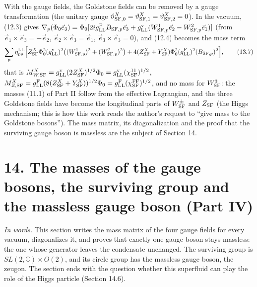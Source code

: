 \documentclass[
  10pt,
]{article}
\begin{document}
With the gauge fields, the Goldstone fields can be removed by a gauge
transformation (the unitary gauge
\(\vartheta^X_{{\rm SF},0}=\vartheta^X_{{\rm SF},1}=\vartheta^X_{{\rm SF},2}=0\)).
In the vacuum, (12.3) gives
\(\nabla_p(\Phi_0\vec e_3)=\Phi_0[2ig^{\rm F}_{\rm LL}B_{{\rm SF},p}\vec e_3+g^{\rm v}_{\rm LL}(W^1_{{\rm SF},p}\vec e_2-W^2_{{\rm SF},p}\vec e_1)]\)
(from \(\vec e_1\times\vec e_3=-\vec e_2\),
\(\vec e_2\times\vec e_3=\vec e_1\), \(\vec e_3\times\vec e_3=0\)), and
(12.4) becomes the mass term
\[\sum_p\eta^{\rm LL}_{pp}\Big[Z^X_{\rm SF}\Phi_0^2(g^{\rm v}_{\rm LL})^2\big((W^1_{{\rm SF},p})^2+(W^2_{{\rm SF},p})^2\big)+4(Z^X_{\rm SF}+Y^X_{\rm SF})\Phi_0^2(g^{\rm F}_{\rm LL})^2(B_{{\rm SF},p})^2\Big],\tag{13.7}\]
that is
\(M^X_{W,{\rm SF}}=g^{\rm v}_{\rm LL}(2Z^X_{\rm SF})^{1/2}\Phi_0=g^{\rm v}_{\rm LL}(\chi^{11}_{\rm SF})^{1/2}\),
\(M^X_{Z,{\rm SF}}=g^{\rm F}_{\rm LL}(8(Z^X_{\rm SF}+Y^X_{\rm SF}))^{1/2}\Phi_0=g^{\rm F}_{\rm LL}(\chi^{\rm FF}_{\rm SF})^{1/2}\),
and no mass for \(W^3_{\rm SF}\): the masses (11.1) of Part II follow
from the effective Lagrangian, and the three Goldstone fields have
become the longitudinal parts of \(W^\pm_{\rm SF}\) and \(Z_{\rm SF}\)
(the Higgs mechanism; this is how this work reads the author's request
to ``give mass to the Goldstone bosons''). The mass matrix, its
diagonalization and the proof that the surviving gauge boson is massless
are the subject of Section 14.

\hypertarget{the-masses-of-the-gauge-bosons-the-surviving-group-and-the-massless-gauge-boson-part-iv}{%
\section{14. The masses of the gauge bosons, the surviving group and the
massless gauge boson (Part
IV)}\label{the-masses-of-the-gauge-bosons-the-surviving-group-and-the-massless-gauge-boson-part-iv}}

\emph{In words.} This section writes the mass matrix of the four gauge
fields for every vacuum, diagonalizes it, and proves that exactly one
gauge boson stays massless: the one whose generator leaves the
condensate unchanged. The surviving group is
\(SL(2,\mathbb C)\times O(2)\), and its circle group has the massless
gauge boson, the zeugon. The section ends with the question whether this
superfluid can play the role of the Higgs particle (Section 14.6).
\end{document}
